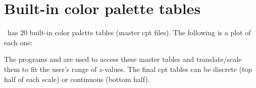 %
%
\chapter{Built-in color palette tables}
\thispagestyle{headings}

\GMT\ has 20 built-in color palette tables (master cpt files).  The following is
a plot of each one: \\ 


The programs  and  are used to access these
master tables and translate/scale them to fit the user's range of $z$-values.
The final cpt tables can be discrete (top half of each scale) or continuous
(bottom half).
